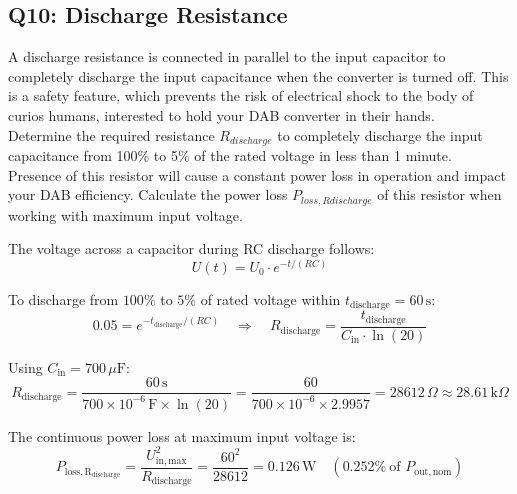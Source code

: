 \documentclass{PELsmallreport}
\begin{document}
      \quad
    \hfill{}  

\subsection{Q10: Discharge Resistance}
A discharge resistance is connected in parallel to the input capacitor to completely discharge the input capacitance when the converter is turned off. This is a safety feature, which prevents the risk of electrical shock to the body of curios humans, interested to hold your DAB converter in their hands.\\

Determine the required resistance $R_{discharge}$ to completely discharge the input capacitance from 100\% to 5\% of the rated voltage in less than 1 minute. \\

Presence of this resistor will cause a constant power loss in operation and impact your DAB efficiency. Calculate the power loss $P_{loss,Rdischarge}$ of this resistor when working with maximum input voltage. \\

     \begin{framed}
        \vspace{2em}
The voltage across a capacitor during RC discharge follows:
\begin{equation}
    U(t) = U_0 \cdot e^{-t/(RC)}
\end{equation}

To discharge from $100\%$ to $5\%$ of rated voltage within
$t_\mathrm{discharge} = 60\,\mathrm{s}$:
\begin{equation}
    0.05 = e^{-t_\mathrm{discharge}/(RC)}
    \quad\Rightarrow\quad
    R_\mathrm{discharge} = \frac{t_\mathrm{discharge}}{C_\mathrm{in}\cdot\ln(20)}
\end{equation}

Using $C_\mathrm{in} = 700\,\mu\mathrm{F}$:
\begin{equation}
    R_\mathrm{discharge}
        = \frac{60\,\mathrm{s}}{700\times10^{-6}\,\mathrm{F}\times\ln(20)}
        = \frac{60}{700\times10^{-6}\times2.9957}
        = 28 612\,\Omega
        \approx 28.61\,\mathrm{k}\Omega
\end{equation}

The continuous power loss at maximum input voltage is:
\begin{equation}
    P_\mathrm{loss,R_{discharge}}
        = \frac{U_\mathrm{in,max}^2}{R_\mathrm{discharge}}
        = \frac{60^2}{28612}
        = 0.126\,\mathrm{W}
        \quad (0.252\%\ \text{of } P_\mathrm{out,nom})
\end{equation}
        \vspace{2em}
    \end{framed}
            
\end{document}
